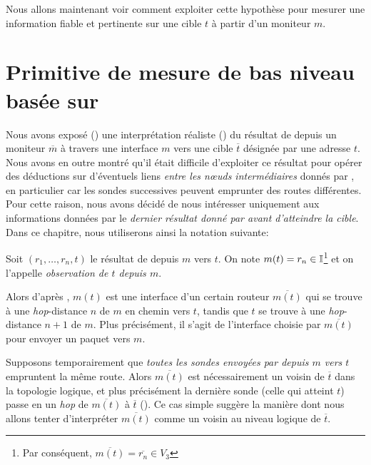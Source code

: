 Nous allons maintenant voir comment exploiter cette hypothèse pour mesurer une
information fiable et pertinente sur une cible $t$ à partir d'un moniteur $m$.

\section{Primitive de mesure de bas niveau basée sur \traceroute}
\label{sec:traceroute-one-to-one}

Nous avons exposé () une interprétation réaliste
() du résultat de \traceroute depuis un moniteur
$\overline{m}$ à travers une interface $m$ vers une cible $\overline{t}$
désignée par une adresse $t$. Nous avons en outre montré qu'il était difficile
d'exploiter ce résultat pour opérer des déductions sur d'éventuels liens {\em
entre les n\oe{}uds intermédiaires} donnés par \traceroute, en particulier car les
sondes successives peuvent emprunter des routes différentes. Pour cette raison,
nous avons décidé de nous intéresser uniquement aux informations données par le
{\em dernier résultat donné par \traceroute avant d'atteindre la cible}. Dans ce
chapitre, nous utiliserons ainsi la notation suivante:

\begin{definition} Soit $(r_1,
\ldots, r_n, t)$ le résultat de \traceroute depuis $m$ vers $t$. On note $m(t) =
r_n \in \mathbb{I}$\footnote{Par conséquent, $\overline{m(t)} = \overline{r_n} \in
V_3$} et on l'appelle {\em observation de $t$ depuis $m$}.
\label{def:traceroute-one-to-one}
\end{definition}

Alors d'après , $m(t)$ est une interface d'un
certain routeur $\overline{m(t)}$ qui se trouve à une {\em hop}-distance $n$ de
$m$ en chemin vers $t$, tandis que $t$ se trouve à une {\em hop}-distance $n+1$
de $m$. Plus précisément, il s'agit de l'interface choisie par $\overline{m(t)}$
pour envoyer un paquet \icmptimeout vers $m$.

Supposons temporairement que {\em toutes les sondes envoyées par \traceroute
depuis $m$ vers $t$} empruntent la même route. Alors $\overline{m(t)}$ est
nécessairement un voisin de $\overline{t}$ dans la topologie logique, et plus
précisément la dernière sonde \traceroute (celle qui atteint $t$) passe en un
{\em hop} de $\overline{m(t)}$ à $\overline{t}$
(). Ce cas simple suggère la manière
dont nous allons tenter d'interpréter $\overline{m(t)}$ comme un voisin au niveau
logique de $\overline{t}$.

